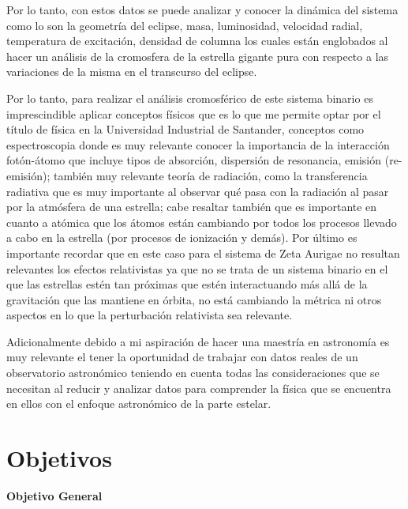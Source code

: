 \documentclass[11pt]{article}
\begin{document}
Por lo tanto, con estos datos se puede analizar y conocer la dinámica del sistema como lo son la geometría del eclipse, masa, luminosidad, velocidad radial, temperatura de excitación, densidad de columna los cuales están englobados al hacer un análisis de la cromosfera de la estrella gigante pura con respecto a las variaciones de la misma en el transcurso del eclipse.

Por lo tanto, para realizar el análisis cromosférico de este sistema binario es imprescindible aplicar conceptos físicos que es lo que me permite optar por el título de física en la Universidad Industrial de Santander, conceptos como espectroscopia donde es muy relevante conocer la importancia de la interacción fotón-átomo que incluye tipos de absorción, dispersión de resonancia, emisión (re-emisión); también muy relevante teoría de radiación, como la transferencia radiativa que es muy importante al observar qué pasa con la radiación al pasar por la atmósfera de una estrella; cabe resaltar también que es importante en cuanto a atómica que los átomos están cambiando por todos los procesos llevado a cabo en la estrella (por procesos de ionización y demás). Por último es importante recordar que en este caso para el sistema de Zeta Aurigae no resultan relevantes los efectos relativistas ya que no se trata de un sistema binario en el que las estrellas estén tan próximas que estén interactuando más allá de la gravitación que las mantiene en órbita, no está cambiando la métrica ni otros aspectos en lo que la perturbación relativista sea relevante.

\noindent Adicionalmente debido a mi aspiración de hacer una maestría en astronomía es muy relevante el tener la oportunidad de trabajar con datos reales de un observatorio astronómico teniendo en cuenta todas las consideraciones que se necesitan al reducir y analizar datos para comprender la física que se encuentra en ellos con el enfoque astronómico de la parte estelar.

\section{Objetivos}

\textbf{Objetivo General}
\end{document}
